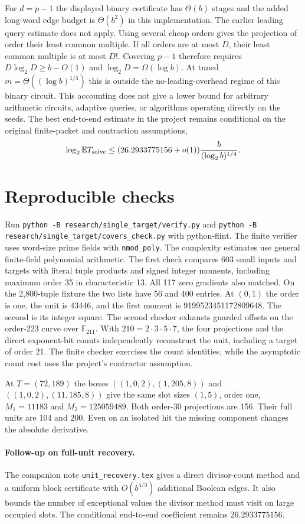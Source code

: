 \documentclass[11pt]{article}
\newcommand{\F}{\mathbb F}
\begin{document}
For $d=p-1$ the displayed binary certificate has $\Theta(b)$
stages and the added long-word edge budget is $\Theta(b^2)$ in
this implementation. The earlier leading query estimate does not
apply. Using several cheap orders gives the projection of order
their least common multiple. If all orders are at most $D$, their
least common multiple is at most $D!$. Covering $p-1$ therefore
requires $D\log_2 D\ge b-O(1)$ and $\log_2 D=\Omega(\log b)$.
At tuned $m=\Theta((\log b)^{1/4})$ this is outside the
no-leading-overhead regime of this binary circuit. This accounting
does not give a lower bound for arbitrary arithmetic circuits,
adaptive queries, or algorithms operating directly on the seeds.
The best end-to-end estimate in the project remains conditional on
the original finite-packet and contraction assumptions,
\[
 \log_2\mathbb E T_{\rm solve}\le(26.2933775156+o(1))
                       \frac{b}{(\log_2 b)^{1/4}} .
\]

\section{Reproducible checks}
Run \texttt{python -B research/single\_target/verify.py} and
\texttt{python -B research/single\_target/covers\_check.py} with
python-flint. The finite verifier uses word-size prime fields with
\texttt{nmod\_poly}. The complexity estimates use general finite-field
polynomial arithmetic. The first check compares 603 small inputs and targets with
literal tuple products and signed integer moments, including
maximum order 35 in characteristic 13. All 117 zero gradients
also matched. On the 2,800-tuple fixture the two lists have 56
and 400 entries. At $(0,1)$ the order is one, the unit is 43446,
and the first moment is 9199523451172809648. The second is its
integer square. The second checker exhausts guarded offsets on
the order-223 curve over $\F_{211}$. With $210=2\cdot3\cdot5
\cdot7$, the four projections and the direct exponent-bit counts
independently reconstruct the unit, including a target of order
21. The finite checker exercises the count identities, while
the asymptotic count cost uses the project's contractor assumption.

At $T=(72,189)$ the boxes $((1,0,2),(1,205,8))$ and
$((1,0,2),(11,185,8))$ give the same slot sizes $(1,5)$, order
one, $M_1=11183$ and $M_2=125059489$. Both order-30 projections
are 156. Their full units are 104 and 200. Even on an isolated hit
the missing component changes the absolute derivative.

\paragraph{Follow-up on full-unit recovery.}
The companion note \texttt{unit\_recovery.tex} gives a direct divisor-count
method and a uniform block certificate with $O(b^{4/3})$ additional
Boolean edges. It also bounds the number of exceptional values the
divisor method must visit on large occupied slots. The conditional
end-to-end coefficient remains $26.2933775156$.
\end{document}
